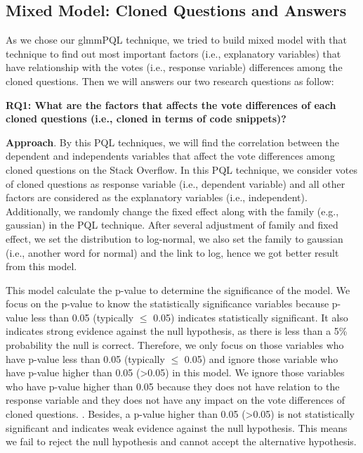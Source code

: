 \documentclass[conference]{IEEEtran}
\begin{document}
\subsection{Mixed Model: Cloned Questions and Answers}
As we chose our glmmPQL technique, we tried to build mixed model with that technique to find out most important factors (i.e., explanatory variables) that have relationship with the votes (i.e., response variable) differences among the cloned questions.  Then we will answers our two research questions as follow:
\newline 

\textbf{RQ1: What are the factors that affects the vote differences of each cloned questions (i.e., cloned in terms of code snippets)?}
\newline

\textbf{Approach}. By this PQL techniques, we will find the correlation between the dependent and independents variables that affect the vote differences among cloned questions on the Stack Overflow.  In this PQL technique, we consider votes of cloned questions as response variable (i.e., dependent variable) and all other factors are considered as the  explanatory variables (i.e., independent). Additionally,  we randomly change the fixed effect along with the family (e.g., gaussian) in the PQL technique. After several adjustment of family and fixed effect, we set the distribution to log-normal, we also set the family to gaussian (i.e., another word for normal) and the link to log, hence we got better result from this model. 

This model calculate the p-value to determine the significance of the model. We focus on the p-value to know the statistically significance variables because p-value less than 0.05 (typically $\leq$ 0.05) indicates statistically significant. It also indicates strong evidence against the null hypothesis, as there is less than a 5\% probability the null is correct. Therefore, we only focus on those variables who have p-value less than 0.05 (typically $\leq$ 0.05) and ignore those variable who have p-value higher than 0.05 (\textgreater 0.05) in this model. We ignore those variables who have p-value higher than 0.05  because they does not have  relation to the response variable and they does not have any impact on the vote differences of cloned questions.  . Besides, a p-value higher than 0.05 (\textgreater 0.05) is not statistically significant and indicates weak evidence against the null hypothesis. This means we fail to reject the null hypothesis and cannot accept the alternative hypothesis.\newline
\end{document}
